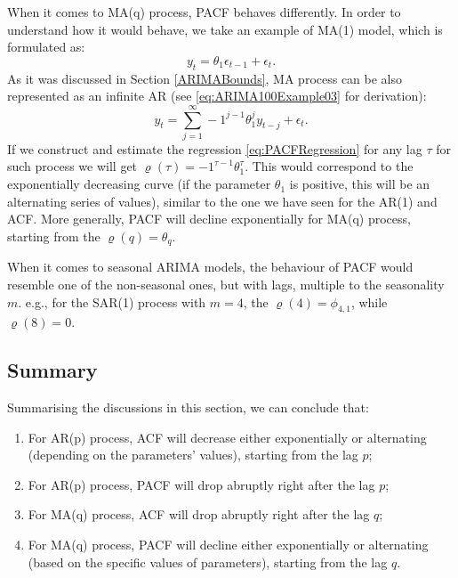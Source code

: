 \documentclass[
]{book}
\providecommand{\tightlist}{%
  \setlength{\itemsep}{0pt}\setlength{\parskip}{0pt}}
\theoremstyle{definition}
\theoremstyle{definition}
\theoremstyle{definition}
\theoremstyle{definition}
\theoremstyle{remark}
\begin{document}
When it comes to MA(q) process, PACF behaves differently. In order to understand how it would behave, we take an example of MA(1) model, which is formulated as:
\begin{equation*}
  y_t = \theta_1 \epsilon_{t-1} + \epsilon_t.
\end{equation*}
As it was discussed in Section \ref{ARIMABounds}, MA process can be also represented as an infinite AR (see \eqref{eq:ARIMA100Example03} for derivation):
\begin{equation*}
  y_t = \sum_{j=1}^\infty -1^{j-1} \theta_1^j y_{t-j} + \epsilon_t.
\end{equation*}
If we construct and estimate the regression \eqref{eq:PACFRegression} for any lag \(\tau\) for such process we will get \(\varrho(\tau)=-1^{\tau-1} \theta_1^\tau\). This would correspond to the exponentially decreasing curve (if the parameter \(\theta_1\) is positive, this will be an alternating series of values), similar to the one we have seen for the AR(1) and ACF. More generally, PACF will decline exponentially for MA(q) process, starting from the \(\varrho(q)=\theta_q\).

When it comes to seasonal ARIMA models, the behaviour of PACF would resemble one of the non-seasonal ones, but with lags, multiple to the seasonality \(m\). e.g., for the SAR(1) process with \(m=4\), the \(\varrho(4)=\phi_{4,1}\), while \(\varrho(8)=0\).

\hypertarget{BJApproachSummary}{%
\subsection{Summary}\label{BJApproachSummary}}

Summarising the discussions in this section, we can conclude that:

\begin{enumerate}
\def\labelenumi{\arabic{enumi}.}
\tightlist
\item
  For AR(p) process, ACF will decrease either exponentially or alternating (depending on the parameters' values), starting from the lag \(p\);
\item
  For AR(p) process, PACF will drop abruptly right after the lag \(p\);
\item
  For MA(q) process, ACF will drop abruptly right after the lag \(q\);
\item
  For MA(q) process, PACF will decline either exponentially or alternating (based on the specific values of parameters), starting from the lag \(q\).
\end{enumerate}
\end{document}
